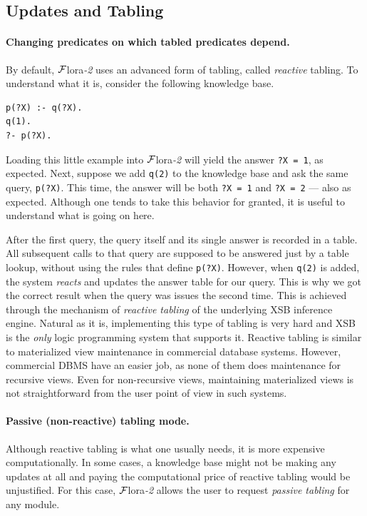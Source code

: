 \documentclass[11pt]{article}
\newcommand{\FLORA}{{\mbox{\sc ${\cal F}${lora}\rm\emph{-2}}}\xspace}
\newcommand{\FLSYSTEM}{\FLORA}
\begin{document}
\subsection{Updates and Tabling}\label{sec-updates-tabling}

\paragraph{Changing predicates on which tabled predicates depend.}
By default, \FLSYSTEM uses an advanced form of tabling, called
\emph{reactive} tabling. To understand what it is, consider the following
knowledge base.
\begin{verbatim}
p(?X) :- q(?X).
q(1).
?- p(?X).
\end{verbatim}
Loading this little example into \FLSYSTEM will yield the answer
\texttt{?X = 1}, as expected. Next, suppose we add \texttt{q(2)} to the
knowledge base and ask the same query, \texttt{p(?X)}. This time, the answer
will be both \texttt{?X = 1} and \texttt{?X = 2} --- also as expected.
Although one tends to take this behavior for granted, it is useful to
understand what is going on here.

After the first query, the query itself and its single answer is recorded
in a table. All subsequent calls to that query are supposed to be answered
just by a table lookup, without using the rules that define \texttt{p(?X)}.
However, when \texttt{q(2)} is added, the system \emph{reacts} and updates the
answer table for our query. This is why we got the correct result when the
query was issues the second time. This is achieved through the mechanism of
\emph{reactive tabling} of the underlying XSB inference engine. Natural as
it is, implementing this type of tabling is very hard and XSB is the
\emph{only} logic programming system that supports it.
Reactive tabling is similar to materialized view maintenance in commercial
database systems. However, commercial DBMS have an easier job, as none of
them does maintenance for recursive views. Even for non-recursive views,
maintaining materialized views is not straightforward from the user
point of view in such systems.

\paragraph{Passive (non-reactive) tabling mode.}
Although reactive tabling is what one usually needs, it is more expensive
computationally. In some cases, a knowledge base might not be making any
updates at all and paying the computational
price of reactive tabling would be unjustified.
For this case, \FLSYSTEM allows the user to request \emph{passive tabling}
for any module.  
\end{document}
